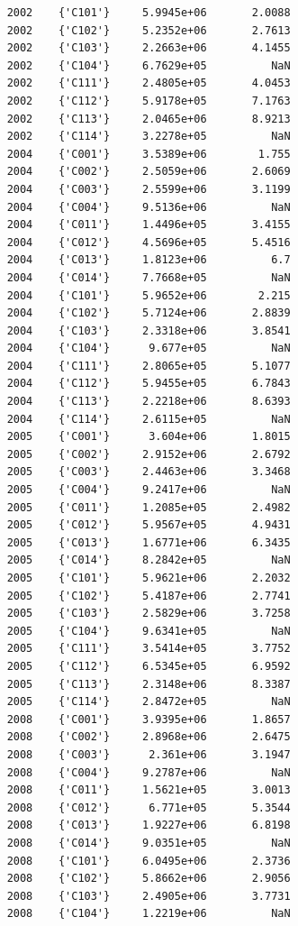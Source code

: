 \documentclass[
]{book}
\begin{document}
\begin{verbatim}
    2002    {'C101'}     5.9945e+06       2.0088 
    2002    {'C102'}     5.2352e+06       2.7613 
    2002    {'C103'}     2.2663e+06       4.1455 
    2002    {'C104'}     6.7629e+05          NaN 
    2002    {'C111'}     2.4805e+05       4.0453 
    2002    {'C112'}     5.9178e+05       7.1763 
    2002    {'C113'}     2.0465e+06       8.9213 
    2002    {'C114'}     3.2278e+05          NaN 
    2004    {'C001'}     3.5389e+06        1.755 
    2004    {'C002'}     2.5059e+06       2.6069 
    2004    {'C003'}     2.5599e+06       3.1199 
    2004    {'C004'}     9.5136e+06          NaN 
    2004    {'C011'}     1.4496e+05       3.4155 
    2004    {'C012'}     4.5696e+05       5.4516 
    2004    {'C013'}     1.8123e+06          6.7 
    2004    {'C014'}     7.7668e+05          NaN 
    2004    {'C101'}     5.9652e+06        2.215 
    2004    {'C102'}     5.7124e+06       2.8839 
    2004    {'C103'}     2.3318e+06       3.8541 
    2004    {'C104'}      9.677e+05          NaN 
    2004    {'C111'}     2.8065e+05       5.1077 
    2004    {'C112'}     5.9455e+05       6.7843 
    2004    {'C113'}     2.2218e+06       8.6393 
    2004    {'C114'}     2.6115e+05          NaN 
    2005    {'C001'}      3.604e+06       1.8015 
    2005    {'C002'}     2.9152e+06       2.6792 
    2005    {'C003'}     2.4463e+06       3.3468 
    2005    {'C004'}     9.2417e+06          NaN 
    2005    {'C011'}     1.2085e+05       2.4982 
    2005    {'C012'}     5.9567e+05       4.9431 
    2005    {'C013'}     1.6771e+06       6.3435 
    2005    {'C014'}     8.2842e+05          NaN 
    2005    {'C101'}     5.9621e+06       2.2032 
    2005    {'C102'}     5.4187e+06       2.7741 
    2005    {'C103'}     2.5829e+06       3.7258 
    2005    {'C104'}     9.6341e+05          NaN 
    2005    {'C111'}     3.5414e+05       3.7752 
    2005    {'C112'}     6.5345e+05       6.9592 
    2005    {'C113'}     2.3148e+06       8.3387 
    2005    {'C114'}     2.8472e+05          NaN 
    2008    {'C001'}     3.9395e+06       1.8657 
    2008    {'C002'}     2.8968e+06       2.6475 
    2008    {'C003'}      2.361e+06       3.1947 
    2008    {'C004'}     9.2787e+06          NaN 
    2008    {'C011'}     1.5621e+05       3.0013 
    2008    {'C012'}      6.771e+05       5.3544 
    2008    {'C013'}     1.9227e+06       6.8198 
    2008    {'C014'}     9.0351e+05          NaN 
    2008    {'C101'}     6.0495e+06       2.3736 
    2008    {'C102'}     5.8662e+06       2.9056 
    2008    {'C103'}     2.4905e+06       3.7731 
    2008    {'C104'}     1.2219e+06          NaN 

\end{verbatim}
\end{document}
